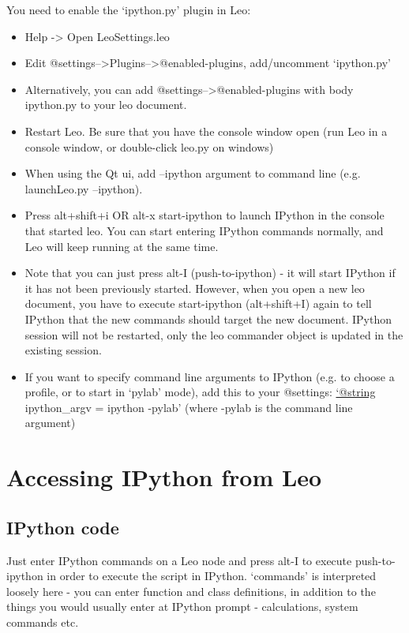 \documentclass[a4paper,10pt,english]{sphinxmanual}
\begin{document}
You need to enable the `ipython.py' plugin in Leo:
\begin{itemize}
\item {} 
Help -\textgreater{} Open LeoSettings.leo

\item {} 
Edit @settings--\textgreater{}Plugins--\textgreater{}@enabled-plugins, add/uncomment `ipython.py'

\item {} 
Alternatively, you can add @settings--\textgreater{}@enabled-plugins with body ipython.py to your leo document.

\item {} 
Restart Leo. Be sure that you have the console window open
(run Leo in a console window, or double-click leo.py on windows)

\item {} 
When using the Qt ui, add --ipython argument to command line (e.g. launchLeo.py --ipython).

\item {} 
Press alt+shift+i OR alt-x start-ipython to launch IPython in the console that
started leo. You can start entering IPython commands normally, and Leo will keep
running at the same time.

\item {} 
Note that you can just press alt-I (push-to-ipython) - it will start IPython
if it has not been previously started. However, when you open a new leo
document, you have to execute start-ipython (alt+shift+I) again to tell
IPython that the new commands should target the new document. IPython session
will not be restarted, only the leo commander object is updated in the
existing session.

\item {} 
If you want to specify command line arguments to IPython (e.g. to choose a
profile, or to start in `pylab' mode), add this to your @settings:
\href{mailto:'@string}{`@string} ipython\_argv = ipython -pylab' (where -pylab is the command line argument)

\end{itemize}


\section{Accessing IPython from Leo}
\label{IPythonBridge:accessing-ipython-from-leo}

\subsection{IPython code}
\label{IPythonBridge:ipython-code}
Just enter IPython commands on a Leo node and press alt-I to execute
push-to-ipython in order to execute the script in IPython. `commands' is
interpreted loosely here - you can enter function and class definitions, in
addition to the things you would usually enter at IPython prompt - calculations,
system commands etc.
\end{document}
